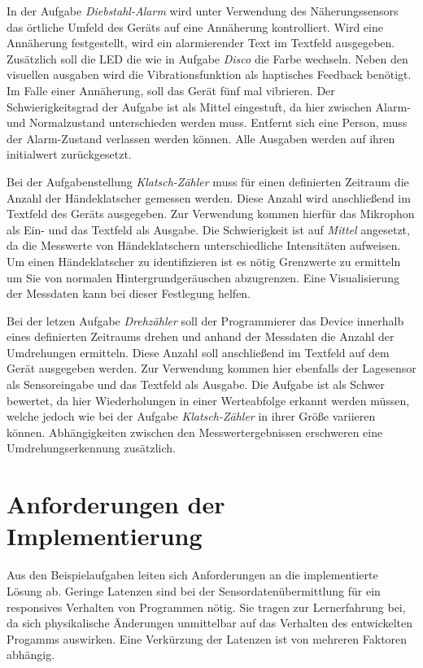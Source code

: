 \documentclass[11pt,a4paper]{report}
\begin{document}
In der Aufgabe \textit{Diebstahl-Alarm} wird unter Verwendung des Näherungssensors das örtliche Umfeld des Geräts auf eine Annäherung kontrolliert.
Wird eine Annäherung festgestellt, wird ein alarmierender Text im Textfeld ausgegeben.
Zusätzlich soll die LED die wie in Aufgabe \textit{Disco} die Farbe wechseln.
Neben den visuellen ausgaben wird die Vibrationsfunktion als haptisches Feedback benötigt.
Im Falle einer Annäherung, soll das Gerät fünf mal vibrieren.
Der Schwierigkeitsgrad der Aufgabe ist als Mittel eingestuft, da hier zwischen Alarm- und Normalzustand unterschieden werden muss.
Entfernt sich eine Person, muss der Alarm-Zustand verlassen werden können.
Alle Ausgaben werden auf ihren initialwert zurückgesetzt.

Bei der Aufgabenstellung \textit{Klatsch-Zähler} muss für einen definierten Zeitraum die Anzahl der Händeklatscher gemessen werden.
Diese Anzahl wird anschließend im Textfeld des Geräts ausgegeben.
Zur Verwendung kommen hierfür das Mikrophon als Ein- und das Textfeld als Ausgabe.
Die Schwierigkeit ist auf \textit{Mittel} angesetzt, da die Messwerte von Händeklatschern unterschiedliche Intensitäten aufweisen.
Um einen Händeklatscher zu identifizieren ist es nötig Grenzwerte zu ermitteln um Sie von normalen Hintergrundgeräuschen abzugrenzen.
Eine Visualisierung der Messdaten kann bei dieser Festlegung helfen.

Bei der letzen Aufgabe \textit{Drehzähler} soll der Programmierer das Device innerhalb eines definierten Zeitraums drehen und anhand der Messdaten die Anzahl der Umdrehungen ermitteln.
Diese Anzahl soll anschließend im Textfeld auf dem Gerät ausgegeben werden.
Zur Verwendung kommen hier ebenfalls der Lagesensor als Sensoreingabe und das Textfeld als Ausgabe.
Die Aufgabe ist als Schwer bewertet, da hier Wiederholungen in einer Werteabfolge erkannt werden müssen, welche jedoch wie bei der Aufgabe \textit{Klatsch-Zähler} in ihrer Größe variieren können.
Abhängigkeiten zwischen den Messwertergebnissen erschweren eine Umdrehungserkennung zusätzlich.

\section{Anforderungen der Implementierung}\label{sec:anforderungen}
Aus den Beispielaufgaben leiten sich Anforderungen an die implementierte Lösung ab.
Geringe Latenzen sind bei der Sensordatenübermittlung für ein responsives Verhalten von Programmen nötig.
Sie tragen zur Lernerfahrung bei, da sich physikalische Änderungen unmittelbar auf das Verhalten des entwickelten Progamms auswirken.
Eine Verkürzung der Latenzen ist von mehreren Faktoren abhängig.
\end{document}
